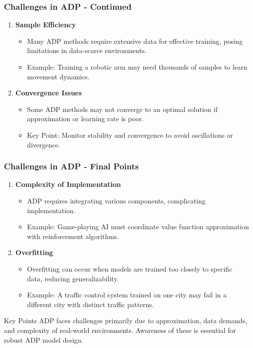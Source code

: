 \documentclass[aspectratio=169]{beamer}
\begin{document}
\begin{frame}[fragile]
    \frametitle{Challenges in ADP - Continued}
    \begin{enumerate}[resume]
        \item \textbf{Sample Efficiency}
        \begin{itemize}
            \item Many ADP methods require extensive data for effective training, posing limitations in data-scarce environments.
            \item Example: Training a robotic arm may need thousands of samples to learn movement dynamics.
        \end{itemize}

        \item \textbf{Convergence Issues}
        \begin{itemize}
            \item Some ADP methods may not converge to an optimal solution if approximation or learning rate is poor.
            \item Key Point: Monitor stability and convergence to avoid oscillations or divergence.
        \end{itemize}
    \end{enumerate}
\end{frame}

\begin{frame}[fragile]
    \frametitle{Challenges in ADP - Final Points}
    \begin{enumerate}[resume]
        \item \textbf{Complexity of Implementation}
        \begin{itemize}
            \item ADP requires integrating various components, complicating implementation.
            \item Example: Game-playing AI must coordinate value function approximation with reinforcement algorithms.
        \end{itemize}

        \item \textbf{Overfitting}
        \begin{itemize}
            \item Overfitting can occur when models are trained too closely to specific data, reducing generalizability.
            \item Example: A traffic control system trained on one city may fail in a different city with distinct traffic patterns.
        \end{itemize}
    \end{enumerate}
    \begin{block}{Key Points}
        ADP faces challenges primarily due to approximation, data demands, and complexity of real-world environments. Awareness of these is essential for robust ADP model design.
    \end{block}
\end{frame}
\end{document}
